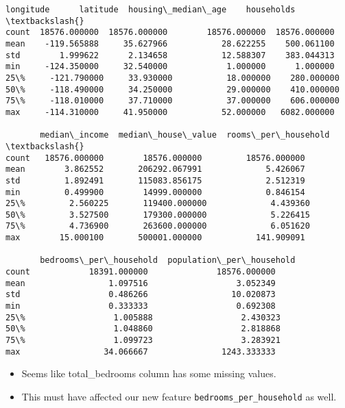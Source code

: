 \documentclass[11pt]{article}
\makeatletter
\providecommand{\tightlist}{%
      \setlength{\itemsep}{0pt}\setlength{\parskip}{0pt}}
\newcommand{\boxspacing}{\kern\kvtcb@left@rule\kern\kvtcb@boxsep}
\newcommand{\prompt}[4]{
        {\ttfamily\llap{{\color{#2}[#3]:\hspace{3pt}#4}}\vspace{-\baselineskip}}
    }
\makeatother
\begin{document}
            \begin{tcolorbox}[breakable, size=fbox, boxrule=.5pt, pad at break*=1mm, opacityfill=0]
\prompt{Out}{outcolor}{22}{\boxspacing}
\begin{Verbatim}[commandchars=\\\{\}]
          longitude      latitude  housing\_median\_age    households  \textbackslash{}
count  18576.000000  18576.000000        18576.000000  18576.000000
mean    -119.565888     35.627966           28.622255    500.061100
std        1.999622      2.134658           12.588307    383.044313
min     -124.350000     32.540000            1.000000      1.000000
25\%     -121.790000     33.930000           18.000000    280.000000
50\%     -118.490000     34.250000           29.000000    410.000000
75\%     -118.010000     37.710000           37.000000    606.000000
max     -114.310000     41.950000           52.000000   6082.000000

       median\_income  median\_house\_value  rooms\_per\_household  \textbackslash{}
count   18576.000000        18576.000000         18576.000000
mean        3.862552       206292.067991             5.426067
std         1.892491       115083.856175             2.512319
min         0.499900        14999.000000             0.846154
25\%         2.560225       119400.000000             4.439360
50\%         3.527500       179300.000000             5.226415
75\%         4.736900       263600.000000             6.051620
max        15.000100       500001.000000           141.909091

       bedrooms\_per\_household  population\_per\_household
count            18391.000000              18576.000000
mean                 1.097516                  3.052349
std                  0.486266                 10.020873
min                  0.333333                  0.692308
25\%                  1.005888                  2.430323
50\%                  1.048860                  2.818868
75\%                  1.099723                  3.283921
max                 34.066667               1243.333333
\end{Verbatim}
\end{tcolorbox}
        
    \begin{itemize}
\tightlist
\item
  Seems like total\_bedrooms column has some missing values.
\item
  This must have affected our new feature
  \texttt{bedrooms\_per\_household} as well.
\end{itemize}
\end{document}
